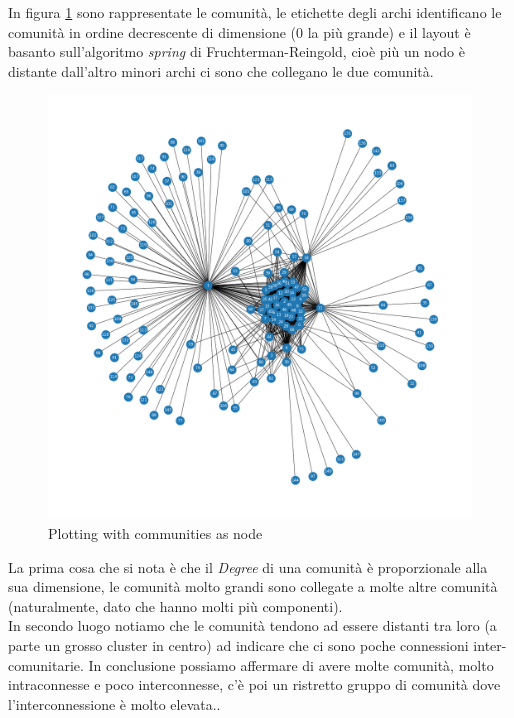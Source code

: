 \documentclass[a4paper]{article}
\begin{document}
In figura \ref{FIG:communities_plot} sono rappresentate le comunità, le etichette degli archi identificano le comunità in ordine decrescente di dimensione (0 la più grande) e il layout è basanto sull'algoritmo \textit{spring} di Fruchterman-Reingold, cioè più un nodo è distante dall'altro minori archi ci sono che collegano le due comunità.\\
\newpage
\begin{figure}[!ht]
\centering
\includegraphics[width=1\textwidth]{cummunity_plot.png}
\caption{Plotting with communities as node} \label{FIG:communities_plot}
\end{figure}
La prima cosa che si nota è che il \textit{Degree} di una comunità è proporzionale alla sua dimensione, le comunità molto grandi sono collegate a molte altre comunità (naturalmente, dato che hanno molti più componenti).\\
In secondo luogo notiamo che le comunità tendono ad essere distanti tra loro (a parte un grosso cluster in centro) ad indicare che ci sono poche connessioni inter-comunitarie.
In conclusione possiamo affermare di avere molte comunità, molto intraconnesse e poco interconnesse, c'è poi un ristretto gruppo di comunità dove l'interconnessione è molto elevata..
\end{document}
